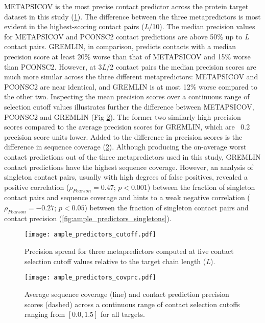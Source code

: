 METAPSICOV is the most precise contact predictor across the protein target dataset in this study (\cref{fig:ample_predictors_cutoff}). The difference between the three metapredictors is most evident in the highest-scoring contact pairs (\textit{L}/10). The median precision values for METAPSICOV and PCONSC2 contact predictions are above 50\% up to \textit{L} contact pairs. GREMLIN, in comparison, predicts contacts with a median precision score at least 20\% worse than that of METAPSICOV and 15\% worse than PCONSC2. However, at 3\textit{L}/2 contact pairs the median precision scores are much more similar across the three different metapredictors: METAPSICOV and PCONSC2 are near identical, and GREMLIN is at most 12\% worse compared to the other two. Inspecting the mean precision scores over a continuous range of selection cutoff values illustrates further the difference between METAPSICOV, PCONSC2 and GREMLIN (Fig \ref{fig:ample_predictors_covprc}). The former two similarly high precision scores compared to the average precision scores for GREMLIN, which are ~0.2 precision score units lower. Added to the difference in precision scores is the difference in sequence coverage (\cref{fig:ample_predictors_covprc}). Although producing the on-average worst contact predictions out of the three metapredictors used in this study, GREMLIN contact predictions have the highest sequence coverage. However, an analysis of singleton contact pairs, usually with high degrees of false positives, revealed a positive correlation ($\rho_{Pearson}=0.47$; $p<0.001$) between the fraction of singleton contact pairs and sequence coverage and hints to a weak negative correlation ($\rho_{Pearson}=-0.27$; $p<0.05$) between the fraction of singleton contact pairs and contact precision (\cref{fig:ample_predictors_singletons}).

\begin{figure}[H]
    \centering
    \texttt{[image: ample\_predictors\_cutoff.pdf]}
    \caption[Precision analysis of three metapredictors]{Precision spread for three metapredictors computed at five contact selection cutoff values relative to the target chain length (\textit{L}).}
    \label{fig:ample_predictors_cutoff}
\end{figure}

\begin{figure}[H]
    \centering
    \texttt{[image: ample\_predictors\_covprc.pdf]}
    \caption[Sequence coverage and contact precision analysis]{Average sequence coverage (line) and contact prediction precision scores (dashed) across a continuous range of contact selection cutoffs ranging from $[0.0, 1.5]$ for all targets.}
    \label{fig:ample_predictors_covprc}
\end{figure}

